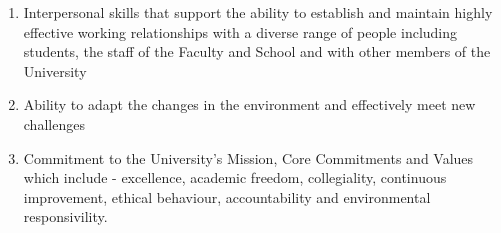 \documentclass[11pt, a4paper]{awesome-cv} %
\begin{document}
\begin{enumerate}
    \item Interpersonal skills that support the ability to establish and maintain highly effective working relationships with a diverse range of people including students, the staff of the Faculty and School and with other members of the University
    \item Ability to adapt the changes in the environment and effectively meet new challenges
    \item Commitment to the University's Mission, Core Commitments and Values which include - excellence, academic freedom, collegiality, continuous improvement, ethical behaviour, accountability and environmental responsivility.
\end{enumerate}
\end{document}
